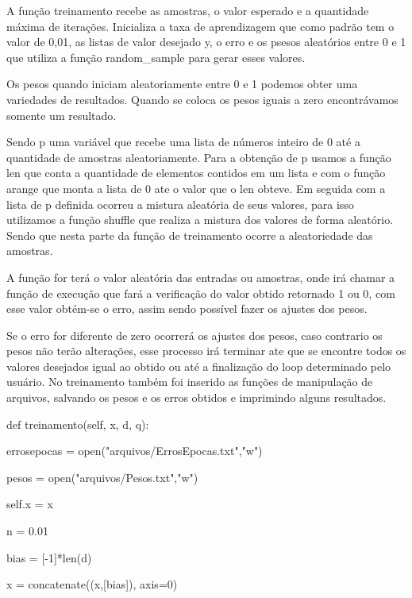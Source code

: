 \documentclass[
12pt, 
a4paper,
oneside,			%
english,			%
french,				%
spanish,			%
brazil,	
]{abntex2}
\begin{document}
 A função treinamento recebe as amostras, o valor esperado e a quantidade máxima de iterações. Inicializa a taxa de aprendizagem que como padrão tem o valor de 0,01, as listas de valor desejado y, o erro e os psesos aleatórios entre 0 e 1 que utiliza a função random\_sample para gerar esses valores. 
 
 Os pesos quando iniciam aleatoriamente entre 0 e 1 podemos obter uma variedades de resultados. Quando se coloca os pesos iguais a zero encontrávamos somente um resultado. 
 
 Sendo p uma variável que recebe uma lista de números inteiro de 0 até a quantidade de amostras aleatoriamente. Para a obtenção de p usamos a função len que conta a quantidade de elementos contidos em um lista e com o função arange que monta a lista de 0 ate o valor que o len obteve. Em seguida com a lista de p definida ocorreu a mistura aleatória de seus valores, para isso utilizamos a função shuffle que realiza a mistura dos valores de forma aleatório. Sendo que nesta parte da função de treinamento ocorre a aleatoriedade das amostras. 
 
 A função for terá o valor aleatória das entradas ou amostras, onde irá chamar a função de execução que fará a verificação do valor obtido retornado 1 ou 0, com esse valor obtém-se o erro, assim sendo possível fazer os ajustes dos pesos. 
 
 Se o erro for diferente de zero ocorrerá os ajustes dos pesos, caso contrario os pesos não terão alterações, esse processo irá terminar ate que se encontre todos os valores desejados igual ao obtido ou até a finalização do loop determinado pelo usuário. No treinamento também foi inserido as funções de manipulação de arquivos, salvando os pesos e os erros obtidos e imprimindo alguns resultados. 
 

def treinamento(self, x, d, q):

\hspace{1,5cm}errosepocas = open("arquivos/ErrosEpocas.txt","w") 

\hspace{1,5cm}pesos = open("arquivos/Pesos.txt","w")

\hspace{1,5cm}self.x = x

\hspace{1,5cm}n = 0.01

\hspace{1,5cm}bias = [-1]*len(d)

\hspace{1,5cm}x = concatenate((x,[bias]), axis=0)
\end{document}
